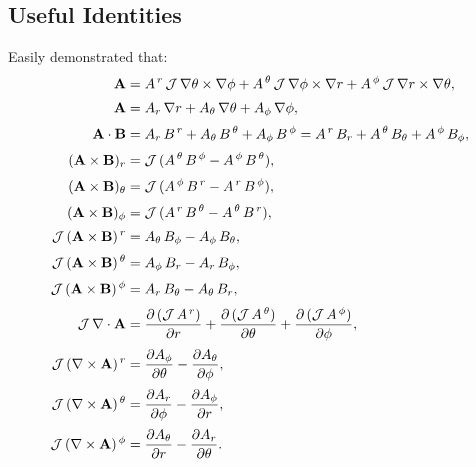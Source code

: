 \documentclass[12pt]{article}
\begin{document}
\subsection{Useful Identities}\label{s2}
Easily demonstrated that:
\begin{align}
{\bf A} &= A^{\,r}\,{\cal J}\,\nabla\theta\times\nabla\phi
+  A^{\,\theta}\,{\cal J}\,\nabla\phi\times\nabla r
+  A^{\,\phi}\,{\cal J}\,\nabla r\times\nabla\theta,\\[0.5ex]
{\bf A} &= A_r\,\nabla r+A_\theta\,\nabla\theta+A_\phi\,\nabla\phi,\\[0.5ex]
{\bf A}\cdot{\bf B} &= A_r\,B^{\,r}+A_\theta \,B^{\,\theta}+A_\phi\,B^{\,\phi}=A^{\,r}\,B_r+A^{\,\theta}\,B_{\theta}+A^{\,\phi}\,B_\phi,\\[0.5ex]
({\bf A}\times {\bf B})_r &= {\cal J}\,(A^{\,\theta}\,B^{\,\phi}-A^{\,\phi}\,B^{\,\theta}),\\[0.5ex]
({\bf A}\times {\bf B})_\theta &= {\cal J}\,(A^{\,\phi}\,B^{\,r}-A^{\,r}\,B^{\,\phi}),\\[0.5ex]
({\bf A}\times {\bf B})_\phi &= {\cal J}\,(A^{\,r}\,B^{\,\theta}-A^{\,\theta}\,B^{\,r}),\\[0.5ex]
{\cal J}\,({\bf A}\times {\bf B})^{\,r} &= A_{\theta}\,B_{\phi}-A_{\phi}\,B_{\theta},\\[0.5ex]
{\cal J}\,({\bf A}\times {\bf B})^{\,\theta} &= A_{\phi}\,B_{r}-A_{r}\,B_{\phi},\\[0.5ex]
{\cal J}\,({\bf A}\times {\bf B})^{\,\phi} &=A_{r}\,B_{\theta}-A_{\theta}\,B_{r},\\[0.5ex]
{\cal J}\,\nabla \cdot{\bf A} &= \frac{\partial\,({\cal J}\,A^{\,r})}{\partial r} + 
\frac{\partial\,({\cal J}\,A^{\,\theta})}{\partial \theta}+ 
\frac{\partial\,({\cal J}\,A^{\,\phi})}{\partial \phi},\\[0.5ex]
{\cal J}\,(\nabla\times {\bf A})^{\,r}&= \frac{\partial A_\phi}{\partial \theta}
-\frac{\partial A_\theta}{\partial \phi},\\[0.5ex]
{\cal J}\,(\nabla\times {\bf A})^{\,\theta}&= \frac{\partial A_r}{\partial \phi}
-\frac{\partial A_\phi}{\partial r},\\[0.5ex]
{\cal J}\,(\nabla\times {\bf A})^{\,\phi}&= \frac{\partial A_\theta}{\partial r}
-\frac{\partial A_r}{\partial \theta}.
\end{align}
\end{document}
